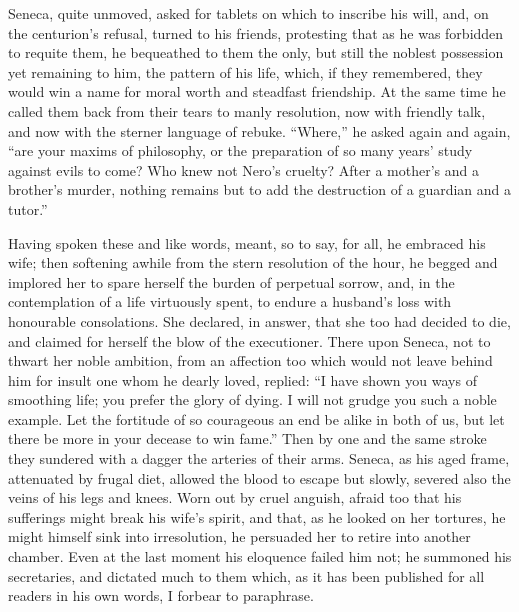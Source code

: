 
Seneca, quite unmoved, asked for tablets on which to inscribe his will, and, on the centurion's refusal, turned to his friends, protesting that as he was forbidden to requite them, he bequeathed to them the only, but still the noblest possession yet remaining to him, the pattern of his life, which, if they remembered, they would win a name for moral worth and steadfast friendship. At the same time he called them back from their tears to manly resolution, now with friendly talk, and now with the sterner language of rebuke. ``Where,'' he asked again and again, ``are your maxims of philosophy, or the preparation of so many years' study against evils to come? Who knew not Nero's cruelty? After a mother's and a brother's murder, nothing remains but to add the destruction of a guardian and a tutor.''


Having spoken these and like words, meant, so to say, for all, he embraced his wife; then softening awhile from the stern resolution of the hour, he begged and implored her to spare herself the burden of perpetual sorrow, and, in the contemplation of a life virtuously spent, to endure a husband's loss with honourable consolations. She declared, in answer, that she too had decided to die, and claimed for herself the blow of the executioner. There upon Seneca, not to thwart her noble ambition, from an affection too which would not leave behind him for insult one whom he dearly loved, replied: ``I have shown you ways of smoothing life; you prefer the glory of dying. I will not grudge you such a noble example. Let the fortitude of so courageous an end be alike in both of us, but let there be more in your decease to win fame.'' Then by one and the same stroke they sundered with a dagger the arteries of their arms. Seneca, as his aged frame, attenuated by frugal diet, allowed the blood to escape but slowly, severed also the veins of his legs and knees. Worn out by cruel anguish, afraid too that his sufferings might break his wife's spirit, and that, as he looked on her tortures, he might himself sink into irresolution, he persuaded her to retire into another chamber. Even at the last moment his eloquence failed him not; he summoned his secretaries, and dictated much to them which, as it has been published for all readers in his own words, I forbear to paraphrase.


